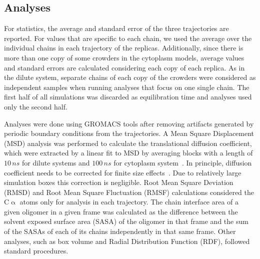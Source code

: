 \documentclass[journal=jpcisd8,manuscript=article]{achemso}
\begin{document}
\subsection{Analyses}
For statistics, the average and standard error of the three trajectories are reported. For values that
are specific to each chain, we used the average over the individual
chains in each trajectory of the replicas. Additionally, since there
is more than one copy of some crowders in the cytoplasm models,
average values and standard errors are calculated considering each copy of each replica. As in the dilute system, separate chains of each copy
of the crowders were considered as independent samples when running
analyses that focus on one single chain. The first half of all
simulations was discarded as equilibration time and analyses used only
the second half.

Analyses were done using GROMACS tools after removing artifacts
generated by periodic boundary conditions from the trajectories. A
Mean Square Displacement (MSD) analysis was performed to calculate the
translational diffusion coefficient, which were extracted by a linear
fit to MSD by averaging blocks with a length of $10\, ns$ for dilute systems and $100\, ns$ 
for cytoplasm system~\cite{Allen1987a}. In principle, diffusion
coefficient needs to be corrected for finite size
effects~\cite{Yeh2004,Abraham2018}. Due to relatively large simulation boxes
this correction is negligible. 
Root Mean Square Deviation (RMSD) and Root Mean Square
Fluctuation (RMSF) calculations considered the C$\upalpha$ atoms only for analysis in each trajectory.
The chain interface area of a given oligomer in a given
frame was calculated as the difference between the solvent exposed
surface area (SASA) of the oligomer in that frame and the sum of the
SASAs of each of its chains independently in that same frame. Other
analyses, such as box volume and Radial Distribution Function (RDF),
followed standard procedures.
\end{document}

